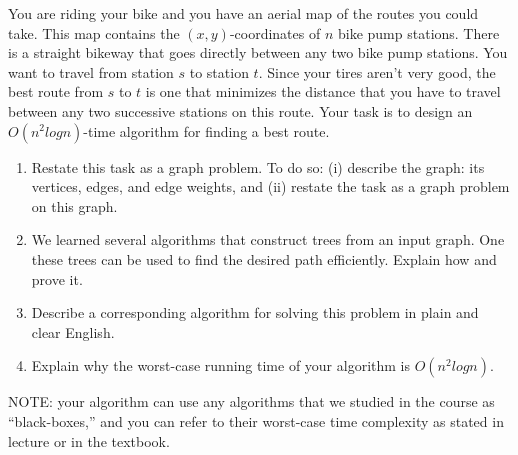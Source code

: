 \documentclass[11pt]{article}
\begin{document}
\noindent You are riding your bike and you have an aerial map of the routes you could take. This map contains the $(x, y)$-coordinates of $n$ bike pump stations. There is a straight bikeway that
goes directly between any two bike pump stations. You want to travel from station $s$ to station $t$. Since
your tires aren’t very good, the best route from $s$ to $t$ is one that minimizes the distance that you have
to travel between any two successive stations on this route. Your task is to design an $O(n^2 log n)$-time
algorithm for finding a best route.

\begin{enumerate}[label=\alph*)]
\item Restate this task as a graph problem. To do so: (i) describe the graph: its vertices, edges, and edge
weights, and (ii) restate the task as a graph problem on this graph.
\item We learned several algorithms that construct trees from an input graph. One these trees can be used
to find the desired path efficiently. Explain how and prove it.
\item Describe a corresponding algorithm for solving this problem in plain and clear English.
\item Explain why the worst-case running time of your algorithm is $O(n^2 log n)$.
\end{enumerate}

\noindent NOTE: your algorithm can use any algorithms that we studied in the course as “black-boxes,” and you can
refer to their worst-case time complexity as stated in lecture or in the textbook.
\end{document}
